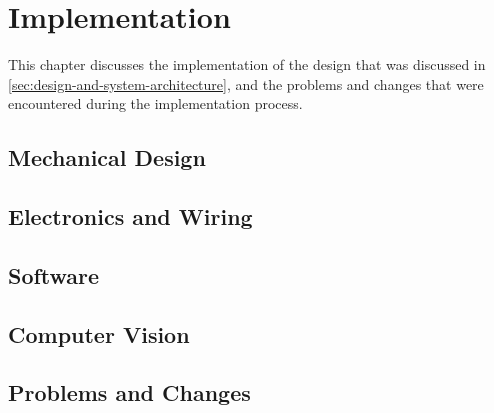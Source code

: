 \section{Implementation}
\label{sec:implementation}

This chapter discusses the implementation of the design that was discussed in \autoref{sec:design-and-system-architecture}, and the problems and changes that were encountered during the implementation process.

\subsection{Mechanical Design}
\label{sec:implementation-mechanical-design}


\subsection{Electronics and Wiring}
\label{sec:electronics}


\subsection{Software}
\label{sec:software}


\subsection{Computer Vision}
\label{sec:computer-vision}
  


\subsection{Problems and Changes}
\label{sec:implementation-problems-and-changes}